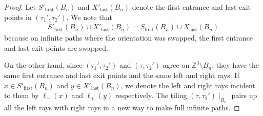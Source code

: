 \documentclass[11pt]{article}
\theoremstyle{remark}
\theoremstyle{definition}
\newcommand{\m}[1]{\mathbb{#1}}
\begin{document}
\begin{proof}
    Let $S'_{\text{first}}(B_n)$ and $X'_{\text{last}}(B_n)$ denote the first entrance and last exit points in $(\tau_1',\tau_2')$. We note that 
    \begin{align*}
        S'_{\text{first}}(B_n)\cup X'_{\text{last}}(B_n) = S_{\text{first}}(B_n)\cup X_{\text{last}}(B_n)
    \end{align*}
    because on infinite paths where the orientation was swapped, the first entrance and last exit points are swapped.
    
    On the other hand, since $(\tau_1',\tau_2')$ and $(\tau,\tau_2')$ agree on $\m Z^3\setminus B_n$, they have the same first entrance and last exit points and the same left and right rays. If $x\in S'_{\text{first}}(B_n)$ and $y\in X'_{\text{last}}(B_n)$, we denote the left and right rays incident to them by $\ell_-(x)$ and $\ell_+(y)$ respectively. The tiling $(\tau,\tau_2')\mid_{B_n}$ pairs up all the left rays with right rays in a new way to make full infinite paths.
    

\end{proof}
\end{document}
